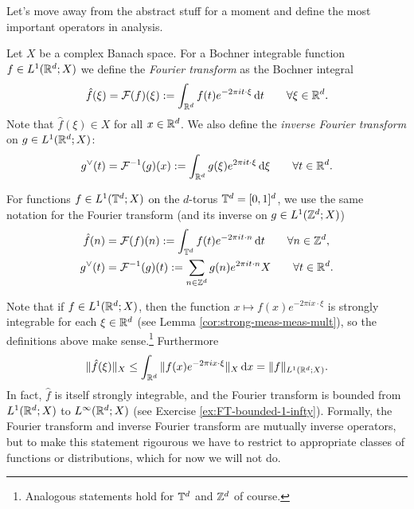Let's move away from the abstract stuff for a moment and define the most important operators in analysis.

\begin{defn}
  Let $X$ be a complex Banach space.
  For a Bochner integrable function $f \in L^1(\mathbb{R}^d;X)$ we define the \emph{Fourier transform} as the Bochner integral
  \begin{equation*}
    \hat{f}(\xi) = \mathcal{F}(f)(\xi) := \int_{\mathbb{R}^d} f(t) e^{-2\pi i t \cdot \xi} \, \mathrm{d} t \qquad \forall \xi \in \mathbb{R}^d. 
  \end{equation*}
  Note that $\hat{f}(\xi) \in X$ for all $x \in \mathbb{R}^d$.
  We also define the \emph{inverse Fourier transform} on $g \in L^1(\mathbb{R}^d;X)$:
  \begin{equation*}
    g^{\vee}(t) = \mathcal{F}^{-1}(g)(x) := \int_{\mathbb{R}^d} g(\xi) e^{2\pi i t \cdot \xi} \, \mathrm{d} \xi \qquad \forall t \in \mathbb{R}^d.
  \end{equation*}

  For functions $f \in L^1(\mathbb{T}^d ; X)$ on the $d$-torus $\mathbb{T}^d = [0,1]^d$, we use the same notation for the Fourier transform (and its inverse on $g \in L^1(\mathbb{Z}^d; X)$)
  \begin{equation*}
    \begin{aligned}
      \hat{f}(n) &= \mathcal{F}(f)(n) := \int_{\mathbb{T}^d} f(t) e^{-2\pi i t \cdot n} \, \mathrm{d} t \qquad \forall n \in \mathbb{Z}^d, \\
      g^{\vee}(t) &= \mathcal{F}^{-1}(g)(t) := \sum_{n \in \mathbb{Z}^d} g(n) e^{2\pi i t \cdot n} X \qquad \forall t \in \mathbb{R}^d.
    \end{aligned}
  \end{equation*}
\end{defn}

Note that if $f \in L^1(\mathbb{R}^d;X)$, then the function $x \mapsto f(x)e^{-2\pi i x \cdot \xi}$ is strongly integrable for each $\xi \in \mathbb{R}^d$ (see Lemma \ref{cor:strong-meas-meas-mult}), so the definitions above make sense.\footnote{Analogous statements hold for $\mathbb{T}^d$ and $\mathbb{Z}^d$ of course.}
Furthermore
\begin{equation*}
  \|\hat{f}(\xi)\|_X \leq \int_{\mathbb{R}^d} \| f(x) e^{-2\pi i x \cdot \xi} \|_X \, \mathrm{d} x = \|f\|_{L^1(\mathbb{R}^d;X)}.
\end{equation*}
In fact, $\hat{f}$ is itself strongly integrable, and the Fourier transform is bounded from $L^1(\mathbb{R}^d;X)$ to $L^\infty(\mathbb{R}^d;X)$ (see Exercise \ref{ex:FT-bounded-1-infty}).
Formally, the Fourier transform and inverse Fourier transform are mutually inverse operators, but to make this statement rigourous we have to restrict to appropriate classes of functions or distributions, which for now we will not do.




